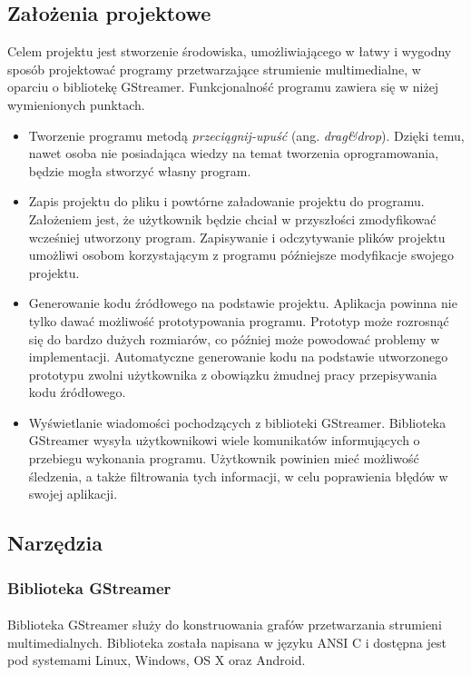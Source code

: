 \documentclass[12pt]{article}
\begin{document}
\subsection{Założenia projektowe}
Celem projektu jest stworzenie środowiska, umożliwiającego w łatwy i wygodny sposób projektować programy przetwarzające strumienie multimedialne, w oparciu o bibliotekę GStreamer. Funkcjonalność programu zawiera się w niżej wymienionych punktach.
\begin{itemize}
 \setlength{\itemsep}{0em}
\item Tworzenie programu metodą \textit{przeciągnij-upuść} (ang. \textit{drag\&drop}). Dzięki temu, nawet osoba nie posiadająca wiedzy na temat tworzenia oprogramowania, będzie mogła stworzyć własny program.
\item Zapis projektu do pliku i powtórne załadowanie projektu do programu. Założeniem jest, że użytkownik będzie chciał w przyszłości zmodyfikować wcześniej utworzony program. Zapisywanie i odczytywanie plików projektu umożliwi osobom korzystającym z programu późniejsze modyfikacje swojego projektu.
\item Generowanie kodu źródłowego na podstawie projektu. Aplikacja powinna nie tylko dawać możliwość prototypowania programu. Prototyp może rozrosnąć się do bardzo dużych rozmiarów, co później może powodować problemy w implementacji. Automatyczne generowanie kodu na podstawie utworzonego prototypu zwolni użytkownika z obowiązku żmudnej pracy przepisywania kodu źródłowego.
\item Wyświetlanie wiadomości pochodzących z biblioteki GStreamer. Biblioteka GStreamer wysyła użytkownikowi wiele komunikatów informujących o przebiegu wykonania programu. Użytkownik powinien mieć możliwość śledzenia, a także filtrowania tych informacji, w celu poprawienia błędów w swojej aplikacji.
\end{itemize}

\subsection{Narzędzia}
\subsubsection{Biblioteka GStreamer}
\paragraph{}
Biblioteka GStreamer służy do konstruowania grafów przetwarzania strumieni multimedialnych. Biblioteka została napisana w języku ANSI C i dostępna jest pod systemami Linux, Windows, OS X oraz Android.
\end{document}
